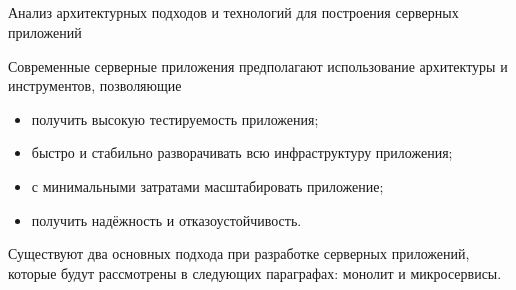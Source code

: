 \subsection{} Анализ архитектурных подходов и технологий для построения серверных приложений
\label{sec:analysis:research:mobArch}

Современные серверные приложения предполагают использование архитектуры и инструментов, позволяющие

\begin{itemize}
\item получить высокую тестируемость приложения;
\item быстро и стабильно разворачивать всю инфраструктуру приложения;
\item с минимальными затратами масштабировать приложение;
\item получить надёжность и отказоустойчивость.
\end{itemize}

Существуют два основных подхода при разработке серверных приложений, которые будут рассмотрены в следующих параграфах: монолит и микросервисы.


